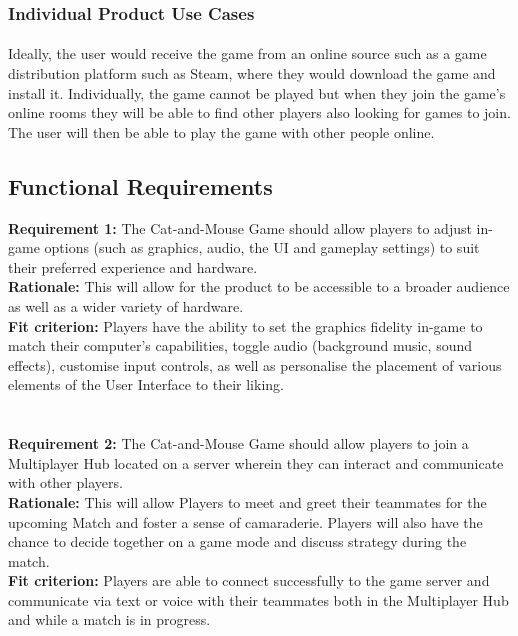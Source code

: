 \documentclass[12pt, titlepage]{article}
\begin{document}
\subsubsection{Individual Product Use Cases}
\paragraph{}Ideally, the user would receive the game from an online source such as a game distribution platform such as Steam, where they would download the game and install it. Individually, the game cannot be played but when they join the game's online rooms they will be able to find other players also looking for games to join. The user will then be able to play the game with other people online. 
\subsection{Functional Requirements}
\textbf{Requirement 1:}  The Cat-and-Mouse Game should allow players to adjust in-game options (such as graphics, audio, the UI and gameplay settings) to suit their preferred experience and hardware.\\
\textbf{Rationale:}  This will allow for the product to be accessible to a broader audience as well as a wider variety of hardware.\\
\textbf{Fit criterion:}  Players have the ability to set the graphics fidelity in-game to match their computer's capabilities, toggle audio (background music, sound effects), customise input controls, as well as personalise the placement of various elements of the User Interface to their liking.\\
\\\\
\textbf{Requirement 2:}  The Cat-and-Mouse Game should allow players to join a Multiplayer Hub located on a server wherein they can interact and communicate with other players.\\
\textbf{Rationale:}  This will allow Players to meet and greet their teammates for the upcoming Match and foster a sense of camaraderie. Players will also have the chance to decide together on a game mode and discuss strategy during the match. \\
\textbf{Fit criterion:}  Players are able to connect successfully to the game server and communicate via text or voice with their teammates both in the Multiplayer Hub and while a match is in progress.\\
\\\\
\end{document}
